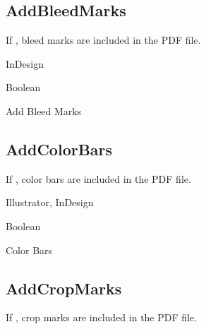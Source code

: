 \documentclass[letterpaper,12pt,english,openany,oneside]{sphinxmanual}
\begin{document}
\subsection{AddBleedMarks}
\label{\detokenize{PDF_Create_NewNamespaces:addbleedmarks}}
If  , bleed marks are included in the PDF file.


InDesign


Boolean


Add Bleed Marks


\begin{sphinxVerbatim}[commandchars=\\\{\}]
\end{sphinxVerbatim}


\subsection{AddColorBars}
\label{\detokenize{PDF_Create_NewNamespaces:addcolorbars}}
If  , color bars are included in the PDF file.

\label{\detokenize{PDF_Create_NewNamespaces:supported-by-1}}

Illustrator, InDesign

\label{\detokenize{PDF_Create_NewNamespaces:type-1}}

Boolean

\label{\detokenize{PDF_Create_NewNamespaces:ui-name-1}}

Color Bars

\label{\detokenize{PDF_Create_NewNamespaces:default-value-1}}

\begin{sphinxVerbatim}[commandchars=\\\{\}]
\end{sphinxVerbatim}


\subsection{AddCropMarks}
\label{\detokenize{PDF_Create_NewNamespaces:addcropmarks}}
If  , crop marks are included in the PDF file.
\end{document}
